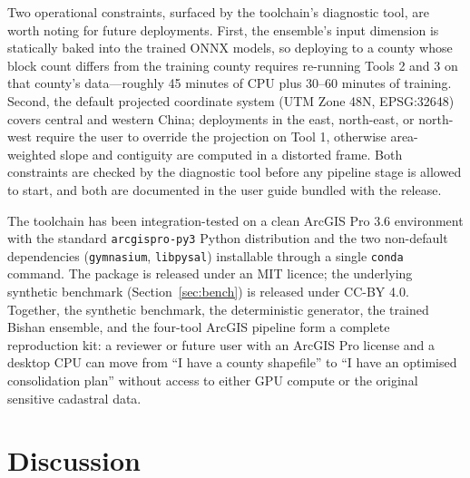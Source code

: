 \documentclass[11pt]{article}
\begin{document}
Two operational constraints, surfaced by the toolchain's diagnostic tool, are worth noting for future deployments. First, the ensemble's input dimension is statically baked into the trained ONNX models, so deploying to a county whose block count differs from the training county requires re-running Tools 2 and 3 on that county's data---roughly 45 minutes of CPU plus 30--60 minutes of training. Second, the default projected coordinate system (UTM Zone 48N, EPSG:32648) covers central and western China; deployments in the east, north-east, or north-west require the user to override the projection on Tool 1, otherwise area-weighted slope and contiguity are computed in a distorted frame. Both constraints are checked by the diagnostic tool before any pipeline stage is allowed to start, and both are documented in the user guide bundled with the release.

The toolchain has been integration-tested on a clean ArcGIS Pro 3.6 environment with the standard \texttt{arcgispro-py3} Python distribution and the two non-default dependencies (\texttt{gymnasium}, \texttt{libpysal}) installable through a single \texttt{conda} command. The package is released under an MIT licence; the underlying synthetic benchmark (Section~\ref{sec:bench}) is released under CC-BY 4.0. Together, the synthetic benchmark, the deterministic generator, the trained Bishan ensemble, and the four-tool ArcGIS pipeline form a complete reproduction kit: a reviewer or future user with an ArcGIS Pro license and a desktop CPU can move from ``I have a county shapefile'' to ``I have an optimised consolidation plan'' without access to either GPU compute or the original sensitive cadastral data.

\section{Discussion}\label{sec:discussion}
\end{document}
